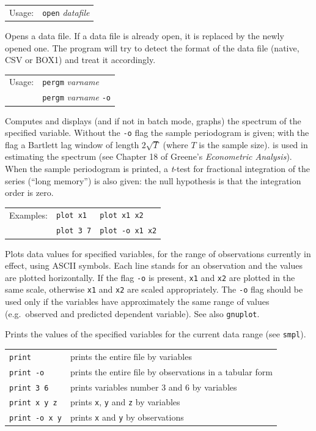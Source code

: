 \documentclass{article}
\begin{document}
{

\begin{tabular}{ll}
Usage:    &     \texttt{open} \textit{datafile}
\end{tabular}

Opens a data file.  If a data file is already open, it is replaced by the
newly opened one.  The program will try to detect the format of the data file
(native, CSV or BOX1) and treat it accordingly.


\begin{tabular}{ll}
Usage:  &        \texttt{pergm} \textit{varname} \\
        &        \texttt{pergm} \textit{varname} \texttt{-o}
\end{tabular}

Computes and displays (and if not in batch mode, graphs) the spectrum
of the specified variable.  Without the \texttt{-o} flag the sample
periodogram is given; with the flag a Bartlett lag window of length
$2\sqrt{T}$ (where $T$ is the sample size).  is used in estimating the
spectrum (see Chapter 18 of Greene's \textit{Econometric Analysis}).
When the sample periodogram is printed, a \textit{t}-test for
fractional integration of the series (``long memory'') is also given:
the null hypothesis is that the integration order is zero.


\begin{tabular}{lll}
Examples:  &  \texttt{plot x1}   &  \texttt{plot x1 x2} \\
        &  \texttt{plot 3 7}  &   \texttt{plot -o x1 x2}
\end{tabular}

Plots data values for specified variables, for the range of
observations currently in effect, using ASCII symbols.  Each line
stands for an observation and the values are plotted horizontally.  If
the flag \texttt{-o} is present, \texttt{x1} and \texttt{x2} are
plotted in the same scale, otherwise \texttt{x1} and \texttt{x2} are
scaled appropriately.  The \texttt{-o} flag should be used only if the
variables have approximately the same range of values (e.g.\ observed
and predicted dependent variable).  See also \texttt{gnuplot}.


Prints the values of the specified variables for the current
data range (see \texttt{smpl}).

\begin{tabular}{lp{4in}}
\texttt{print} & prints the entire file by variables \\
\texttt{print -o} & prints the entire file by observations in a tabular
form \\
\texttt{print 3 6} & prints variables number 3 and 6 by variables \\
\texttt{print x y z} & prints \texttt{x}, 
                  \texttt{y} and \texttt{z} by variables \\
\texttt{print -o x y} & prints \texttt{x} and \texttt{y} by observations
\end{tabular}

}
\end{document}
